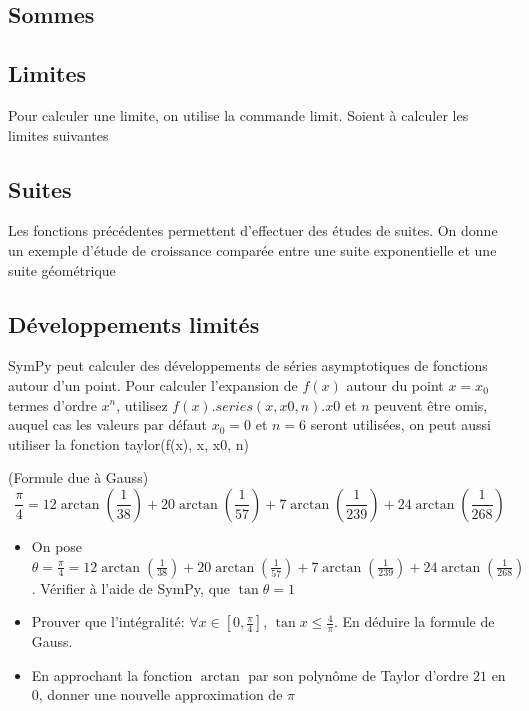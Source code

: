  \subsection{Sommes}
 \subsection{Limites}
Pour calculer une limite, on utilise la commande $\mathrm{limit}$. Soient à calculer les limites suivantes
 \subsection{Suites}
 Les fonctions précédentes permettent d’effectuer des études de suites. On donne un exemple d’étude de croissance comparée entre une suite exponentielle et une suite géométrique
 \subsection{Développements limités}
 SymPy peut calculer des développements de séries asymptotiques de fonctions autour d'un point. Pour calculer 
 l'expansion de $f(x)$ autour du point $x = x_{0}$ termes d'ordre $x^{n}$, utilisez $f(x).series(x, x0, n). x0$ 
 et $n$ peuvent être omis, auquel cas les valeurs par défaut $x_{0} = 0$ et $n = 6$ seront utilisées, on peut 
 aussi utiliser la fonction taylor(f(x), x, x0, n)

\begin{exercise}
 \end{exercise}
 \begin{exercise}(Formule due \`a Gauss)
 \[
 \frac{\pi}{4} = 12\arctan(\frac{1}{38})+20\arctan(\frac{1}{57})+7\arctan(\frac{1}{239})+24\arctan(\frac{1}{268})
 \]
 \begin{itemize}
  \item On pose $\theta = \frac{\pi}{4} = 12\arctan(\frac{1}{38})+20\arctan(\frac{1}{57})+7\arctan(\frac{1}{239})+24\arctan(\frac{1}{268})$. Vérifier à l'aide de SymPy, que $\tan\theta = 1$
  \item Prouver que l'intégralité: $\forall x \in \left[0,\frac{\pi}{4}\right]$, $\tan x \leq \frac{4}{\pi}$. En déduire la formule de Gauss.
  \item En approchant la fonction $\arctan$ par son polynôme de Taylor d’ordre $21$ en $0$, donner une nouvelle approximation de $\pi$
 \end{itemize}
 \end{exercise}
 \begin{exercise}
 \end{exercise}
